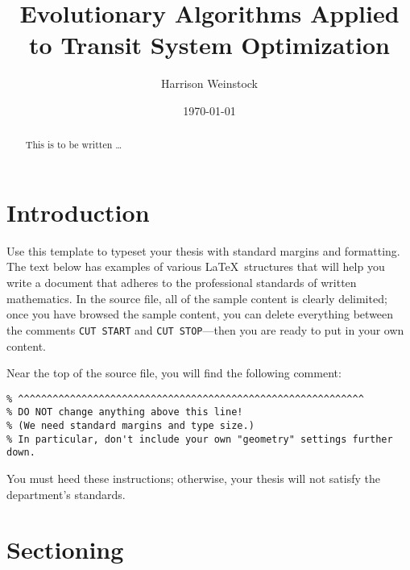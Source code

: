 \documentclass[11pt]{amsart}
\title[Algorithmic Transit Optimization]{Evolutionary Algorithms Applied to Transit System Optimization} %
\author{Harrison Weinstock}
\date{\today} %
\theoremstyle{definition}                  %
\theoremstyle{remark}                       %
\numberwithin{equation}{section}
\begin{document}
\begin{abstract} %
This is to be written \ldots
\end{abstract}

\maketitle %


\tableofcontents %

\section{Introduction}

Use this template to typeset your thesis with standard margins and formatting. The text below has examples of various \LaTeX\ structures that will help you write a 
document that adheres to the professional standards of written mathematics. 
In the source file, all of the sample content is clearly delimited; once you have browsed the sample content, you can delete everything between the comments \texttt{CUT START} and \texttt{CUT STOP}---then you are ready to put in your own content.

Near the top of the source file, you will find the following comment:

\smallskip
\begin{verbatim}
% ^^^^^^^^^^^^^^^^^^^^^^^^^^^^^^^^^^^^^^^^^^^^^^^^^^^^^^^^^^^^
% DO NOT change anything above this line! 
% (We need standard margins and type size.)
% In particular, don't include your own "geometry" settings further down.
\end{verbatim}
\smallskip

You must heed these instructions; otherwise, your thesis will not satisfy the department's standards.


\section{Sectioning}
\end{document}
